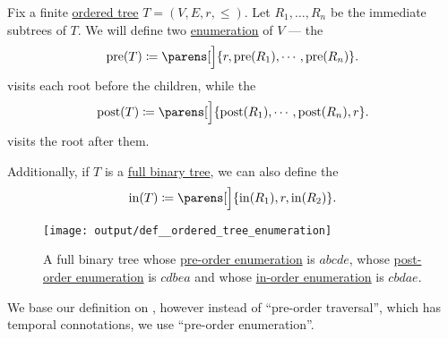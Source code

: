 \begin{definition}\label{def:ordered_tree_enumeration}
  Fix a finite \hyperref[def:ordered_tree]{ordered tree} \( T = (V, E, r, \leq) \). Let \( R_1, \ldots, R_n \) be the immediate subtrees of \( T \). We will define two \hyperref[def:enumeration]{enumeration} of \( V \) --- the 
  \begin{equation}\label{eq:def:ordered_tree_enumeration/pre}
    \op{pre}(T) \coloneqq \parens[\Big]{ r, \op{pre}(R_1), \cdots, \op{pre}(R_n) }.
  \end{equation}
  visits each root before the children, while the 
  \begin{equation}\label{eq:def:ordered_tree_enumeration/post}
    \op{post}(T) \coloneqq \parens[\Big]{ \op{post}(R_1), \cdots, \op{post}(R_n), r }.
  \end{equation}
  visits the root after them.

  Additionally, if \( T \) is a \hyperref[def:n_ary_tree]{full binary tree}, we can also define the 
  \begin{equation}\label{eq:def:ordered_tree_enumeration/in}
    \op{in}(T) \coloneqq \parens[\Big]{ \op{in}(R_1), r, \op{in}(R_2) }.
  \end{equation}

  \begin{figure}[!ht]
    \centering
    \texttt{[image: output/def\_\_ordered\_tree\_enumeration]}
    \caption{A full binary tree whose \hyperref[eq:def:ordered_tree_enumeration/pre]{pre-order enumeration} is \( abcde \), whose \hyperref[eq:def:ordered_tree_enumeration/post]{post-order enumeration} is \( cdbea \) and whose \hyperref[eq:def:ordered_tree_enumeration/in]{in-order enumeration} is \( cbdae \).}
    \label{fig:def:ordered_tree_enumeration}
  \end{figure}
\end{definition}
\begin{comments}
  \item We base our definition on \cite[228]{Erickson2019}, however instead of \enquote{pre-order traversal}, which has temporal connotations, we use \enquote{pre-order enumeration}.
\end{comments}

